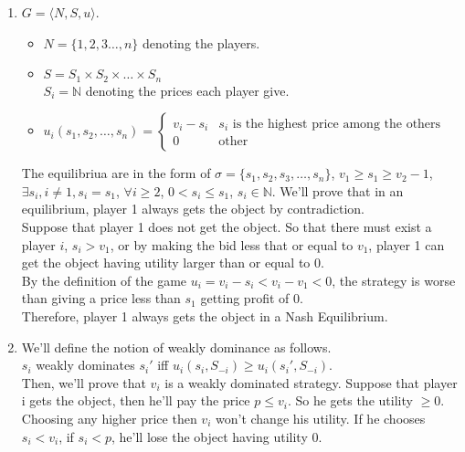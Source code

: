 \documentclass[12pt]{article}
\begin{document}
\begin{enumerate}
    \item $G = \langle N, S, u \rangle$.
        \begin{itemize}
            \item $N = \{1, 2, 3 \ldots , n\}$ denoting the players.
            \item $S = S_1 \times S_2 \times \ldots \times S_n$ \\
                  $S_i = \mathbb{N}$ denoting the prices each player give.
            \item $u_i(s_1, s_2, \dots, s_n) = 
                  \begin{cases}
                        v_i - s_i  &\mbox{$s_i$ is the highest price among the others} \\
                        0 &\mbox{other} 
                  \end{cases}
                  $
        \end{itemize}
          The equilibriua are in the form of $\sigma = \{s_1, s_2, s_3, \ldots, s_n\}$,
          $v_1 \geq s_1 \geq v_2 - 1$,
          $\exists s_i, i \neq 1, s_i = s_1$,
          $\forall i \geq 2$, 
          $0 < s_i \leq s_1$, $s_i \in \mathbb{N}$.
        We'll prove that in an equilibrium, player 1 always gets the object by contradiction. \\
        Suppose that player 1 does not get the object. So that there must exist a player $i$, 
        $s_i > v_1$, or by making the bid less that or equal to $v_1$, player 1 can get the object 
        having utility larger than or equal to 0. \\
        By the definition of the game $u_i = v_i - s_i < v_i - v_1 < 0$, 
        the strategy is worse than giving a price less than $s_1$ getting profit of $0$.\\
        Therefore, player 1 always gets the object in a Nash Equilibrium.
        \item We'll define the notion of weakly dominance as follows. \\
              $s_i$ weakly dominates $s_i'$ iff $u_i(s_i, S_{-i}) \geq u_i(s_i', S_{-i})$.\\
              Then, we'll prove that $v_i$ is a weakly dominated strategy.
              Suppose that player i gets the object, then he'll pay the price $p \leq v_i$.
              So he gets the utility $\geq 0$.
              Choosing any higher price then $v_i$ won't change his utility.
              If he chooses $s_i < v_i$, if $s_i < p$, he'll lose the object having utility 0.

\end{enumerate}
\end{document}
